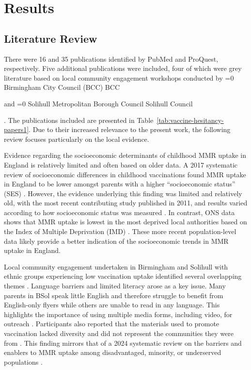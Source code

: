 \documentclass[12pt]{article}
\newcounter{bcc}
\newcommand{\bcc}{%
    \ifnum\value{bcc}=0
        \stepcounter{bcc}%
        Birmingham City Council (BCC)%
        \else
        BCC%
    \fi%
    \xspace
}
\newcounter{solihull}
\newcommand{\solihull}{%
    \ifnum\value{solihull}=0
        \stepcounter{bcc}%
        Solihull Metropolitan Borough Council%
    \else
        Solihull Council%
    \fi%
    \xspace
}
\begin{document}
\section{Results}

\subsection{Literature Review}
\label{sec:vaccine-barriers}

There were 16 and 35 publications identified by PubMed and ProQuest, respectively. Five additional publications were included, four of which were grey literature based on local community engagement workshops conducted by \bcc and \solihull \cite{smbc_community_engagement_learning_2025, kemishi_uasc_health_wellbeing_2025, palmer_birmingham_measles_engagement_2024, bissett_measles_soft_intelligence_2024}. The publications included are presented in Table~\ref{tab:vaccine-hesitancy-papers1}.  Due to their increased relevance to the present work, the following review focuses particularly on the local evidence.


Evidence regarding the socioeconomic determinants of childhood MMR uptake in England is relatively limited and often based on older data. A 2017 systematic review of socioeconomic differences in childhood vaccinations found MMR uptake in England to be lower amongst parents with a higher ``socioeconomic status'' (SES) \cite{bocquier2017socioeconomic}. However, the evidence underlying this finding was limited and relatively old, with the most recent contributing study published in 2011, and results varied according to how socioeconomic status was measured \cite{reading2004infant, Pearce754, brown2008attitudinal, brown2011attitudinal, braveman2005socioeconomic}. In contrast, ONS data shows that MMR uptake is lowest in the most deprived local authorities based on the Index of Multiple Deprivation (IMD) \cite{FTips, imd2025}. These more recent population-level data likely provide a better indication of the socioeconomic trends in MMR uptake in England.

Local community engagement undertaken in Birmingham and Solihull with ethnic groups experiencing low vaccination uptake identified several overlapping themes \cite{bissett_measles_soft_intelligence_2024, palmer_birmingham_measles_engagement_2024, smbc_community_engagement_learning_2025}. Language barriers and limited literacy arose as a key issue. Many parents in BSol speak little English and therefore struggle to benefit from English-only flyers while others are unable to read in any language. This highlights the importance of using multiple media forms, including video, for outreach \cite{palmer_birmingham_measles_engagement_2024, smbc_community_engagement_learning_2025}. Participants also reported that the materials used to promote vaccination lacked diversity and did not represent the communities they were from \cite{palmer_birmingham_measles_engagement_2024}. This finding mirrors that of a 2024 systematic review on the barriers and enablers to MMR uptake among disadvantaged, minority, or underserved populations \cite{essa2024understanding}.
\end{document}

